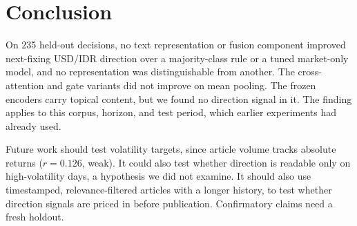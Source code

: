 \section{Conclusion}
\label{sec:conclusion}
On 235 held-out decisions, no text representation or fusion component improved next-fixing USD/IDR direction over a majority-class rule or a tuned market-only model, and no representation was distinguishable from another. The cross-attention and gate variants did not improve on mean pooling. The frozen encoders carry topical content, but we found no direction signal in it. The finding applies to this corpus, horizon, and test period, which earlier experiments had already used.

Future work should test volatility targets, since article volume tracks absolute returns ($r=0.126$, weak). It could also test whether direction is readable only on high-volatility days, a hypothesis we did not examine. It should also use timestamped, relevance-filtered articles with a longer history, to test whether direction signals are priced in before publication. Confirmatory claims need a fresh holdout.
